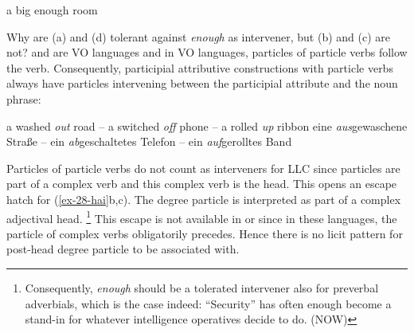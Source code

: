 \documentclass[output=paper
  ,nobabel
  ,uniformtopskip %
]{langscibook}
\begin{document}
\eal\label{ex-28-hai}
\ex\label{ex-bigenough} a big enough room
\label{ex-dedication}
\label{ex-bigroom}

\label{ex-supplies}
\zl

\noindent
Why are  (a) and  (d) tolerant against \emph{enough}
as intervener, but  (b) and  (c) are not?  and  are VO languages and in VO languages, particles of particle verbs follow the verb. Consequently, participial attributive constructions with particle verbs always have particles intervening between the participial attribute and the noun phrase:

\eal
\ex a washed \emph{out} road --  a switched \emph{off} phone -- a rolled \emph{up} ribbon
\ex eine \emph{aus}gewaschene Straße	-- ein \emph{ab}geschaltetes Telefon -- ein \emph{auf}gerolltes Band
\zl

\noindent
Particles of particle verbs do not count as interveners for LLC since particles are part of a complex verb and this complex verb is the head. This opens an escape hatch for (\ref{ex-28-hai}b,c). The degree particle is interpreted as part of a complex adjectival head.%
%
\footnote{Consequently, \emph{enough} should be a tolerated intervener also for preverbal adverbials, which is the case indeed:
\ea ``Security'' has often enough become a stand-in for whatever intelligence operatives decide to do. (NOW)
\zlast
}
This escape is not available in  or  since in these languages, the particle of complex verbs obligatorily precedes. Hence there is no licit pattern for post-head degree particle to be associated with.
\end{document}
